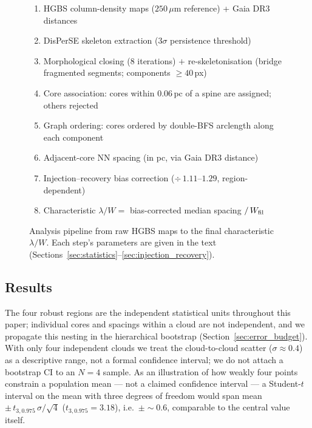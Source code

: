 \documentclass[usenatbib,twoside,twocolumn]{mnras}
\begin{document}
\begin{figure}
\centering
\begin{minipage}{0.95\columnwidth}
\footnotesize
\begin{enumerate}\setlength{\itemsep}{2pt}
\item HGBS column-density maps ($250\,\mu$m reference) + Gaia DR3 distances
\item DisPerSE skeleton extraction ($3\sigma$ persistence threshold)
\item Morphological closing (8 iterations) $+$ re-skeletonisation (bridge fragmented segments; components $\geq40$\,px)
\item Core association: cores within $0.06$\,pc of a spine are assigned; others rejected
\item Graph ordering: cores ordered by double-BFS arclength along each component
\item Adjacent-core NN spacing (in pc, via Gaia DR3 distance)
\item Injection--recovery bias correction ($\div\,1.11$--$1.29$, region-dependent)
\item Characteristic $\lambda/W = $ bias-corrected median spacing $/\,W_{\rm fil}$
\end{enumerate}
\end{minipage}
\caption{Analysis pipeline from raw HGBS maps to the final characteristic $\lambda/W$. Each step's parameters are given in the text (Sections~\ref{sec:statistics}--\ref{sec:injection_recovery}).}
\label{fig:pipeline}
\end{figure}

\subsection{Results}

The four robust regions are the independent statistical units throughout this paper; individual cores and spacings within a cloud are not independent, and we propagate this nesting in the hierarchical bootstrap (Section~\ref{sec:error_budget}). With only four independent clouds we treat the cloud-to-cloud scatter ($\sigma\approx0.4$) as a descriptive range, not a formal confidence interval; we do not attach a bootstrap CI to an $N=4$ sample. As an illustration of how weakly four points constrain a population mean --- not a claimed confidence interval --- a Student-$t$ interval on the mean with three degrees of freedom would span mean\,$\pm\,t_{3,0.975}\,\sigma/\sqrt{4}$ ($t_{3,0.975}=3.18$), i.e.\ $\pm\sim0.6$, comparable to the central value itself.
\end{document}
